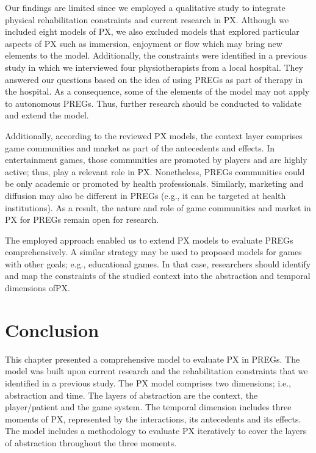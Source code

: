 Our findings are limited since we employed a qualitative study to integrate physical rehabilitation constraints and current research in \ac{PX}. Although we included eight models of \ac{PX}, we also excluded models that explored particular aspects of \ac{PX} such as immersion, enjoyment or flow which may bring new elements to the model. Additionally, the constraints were identified in a previous study in which we interviewed four physiotherapists from a local hospital. They answered our questions based on the idea of using \acp{PREG} as part of therapy in the hospital. As a consequence, some of the elements of the model may not apply to autonomous \acp{PREG}. Thus, further research should be conducted to validate and extend the model.

Additionally, according to the reviewed \ac{PX} models, the context layer comprises game communities and market as part of the antecedents and effects. In entertainment games, those communities are promoted by players and are highly active; thus, play a relevant role in \ac{PX}. Nonetheless, \acp{PREG} communities could be only academic or promoted by health professionals. Similarly, marketing and diffusion may also be different in \acp{PREG} (e.g., it can be targeted at health institutions). As a result, the nature and role of game communities and market in \ac{PX} for \acp{PREG} remain open for research.

The employed approach enabled us to extend \ac{PX} models to evaluate \acp{PREG} comprehensively. A similar strategy may be used to proposed models for games with other goals; e.g., educational games. In that case, researchers should identify and map the constraints of the studied context into the abstraction and temporal dimensions of\ac{PX}.

\section{Conclusion} %
\label{sec:conclusion_model}

This chapter presented a comprehensive model to evaluate \ac{PX} in \acp{PREG}. The model was built upon current research and the rehabilitation constraints that we identified in a previous study. The \ac{PX} model comprises two dimensions; i.e., abstraction and time. The layers of abstraction are the context, the player/patient and the game system. The temporal dimension includes three moments of \ac{PX}, represented by the interactions, its antecedents and its effects. The model includes a methodology to evaluate \ac{PX} iteratively to cover the layers of abstraction throughout the three moments.